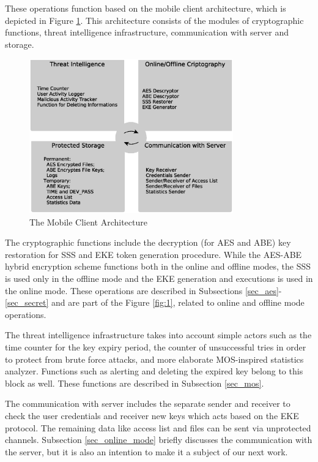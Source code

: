 \documentclass[twocolumn]{svjour3}          %
\begin{document}
These operations function based on the mobile client architecture, which is depicted in Figure \ref{fig:2}. This architecture consists of the modules of cryptographic functions, threat intelligence infrastructure, communication with server and storage.

\begin{figure}[h!]
	\centering
	\includegraphics[width=8.8cm]{figures/mobileclientarchitecture.eps}
	\caption{The Mobile Client Architecture}
	\label{fig:2}
\end{figure}

The cryptographic functions include the decryption (for AES and ABE) key restoration for SSS and EKE token generation procedure. While the AES-ABE hybrid encryption scheme functions both in the online and offline modes, the SSS is used only in the offline mode and the EKE generation and executions is used in the online mode. These operations are described in Subsections \ref{sec_aes}-\ref{sec_secret} and are part of the Figure \ref{fig:1}, related to online and offline mode operations.

The threat intelligence infrastructure takes into account simple actors such as the time counter for the key expiry period, the counter of unsuccessful tries in order to protect from brute force attacks, and more elaborate MOS-inspired statistics analyzer. Functions such as alerting and deleting the expired key belong to this block as well. These functions are described in Subsection \ref{sec_mos}.

The communication with server includes the separate sender and receiver to check the user credentials and receiver new keys which acts based on the EKE protocol. The remaining data like access list and files can be sent via unprotected channels. Subsection \ref{sec_online_mode} briefly discusses the communication with the server, but it is also an intention to make it a subject of our next work.
\end{document}
